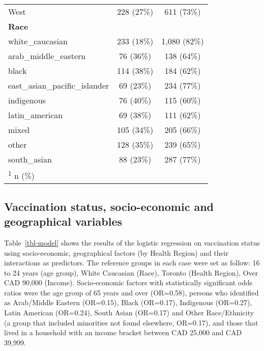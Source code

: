 \documentclass[
  letterpaper,
  DIV=11,
  numbers=noendperiod]{scrartcl}
\begin{document}
\begin{table}
\begin{tabular}{lcc}
\hspace{1em}West & 228 (27\%) & 611 (73\%)\\
\textbf{Race} &  & \\
\addlinespace
\hspace{1em}white\_caucasian & 233 (18\%) & 1,080 (82\%)\\
\hspace{1em}arab\_middle\_eastern & 76 (36\%) & 138 (64\%)\\
\hspace{1em}black & 114 (38\%) & 184 (62\%)\\
\hspace{1em}east\_asian\_pacific\_islander & 69 (23\%) & 234 (77\%)\\
\hspace{1em}indigenous & 76 (40\%) & 115 (60\%)\\
\addlinespace
\hspace{1em}latin\_american & 69 (38\%) & 111 (62\%)\\
\hspace{1em}mixed & 105 (34\%) & 205 (66\%)\\
\hspace{1em}other & 128 (35\%) & 239 (65\%)\\
\hspace{1em}south\_asian & 88 (23\%) & 287 (77\%)\\
\bottomrule
\multicolumn{3}{l}{\rule{0pt}{1em}\textsuperscript{1} n (\%)}\\
\end{tabular}
\endgroup{}
\end{table}

\hypertarget{vaccination-status-socio-economic-and-geographical-variables}{%
\subsection{Vaccination status, socio-economic and geographical
variables}\label{vaccination-status-socio-economic-and-geographical-variables}}

Table~\ref{tbl-model} shows the results of the logistic regression on
vaccination status using socio-economic, geographical factors (by Health
Region) and their interactions as predictors. The reference groups in
each case were set as follow: 16 to 24 years (age group), White
Caucasian (Race), Toronto (Health Region), Over CAD 90,000 (Income).
Socio-economic factors with statistically significant odds ratios were
the age group of 65 years and over (OR=0.58), persons who identified as
Arab/Middle Eastern (OR=0.15), Black (OR=0.17), Indigenous (OR=0.27),
Latin American (OR=0.24), South Asian (OR=0.17) and Other Race/Ethnicity
(a group that included minorities not found elsewhere, OR=0.17), and
those that lived in a household with an income bracket between CAD
25,000 and CAD 39,999.
\end{document}
